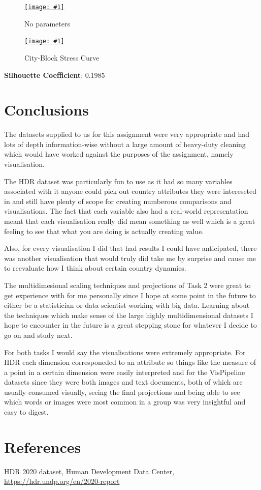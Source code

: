 \documentclass[11pt,a4paper,final]{article}
\newcommand\onlinefig[3]{
\begin{figure}[H]
  \centering
  \href{#3}{\texttt{[image: \#1]}}
  \caption{#2} 
  \label{fig:#1}
\end{figure}
}
\begin{document}
\begin{multicols}{2}
\onlinefig{hdr/pca/pca_hdr_projection_1}{No parameters}{https://user-images.githubusercontent.com/56483187/155839911-ca81d27b-6f95-4806-85ca-5b7c857d63eb.png}
\columnbreak
\onlinefig{hdr/pca/stress_curve_pca_hdr_projection_1}{City-Block Stress Curve}{https://user-images.githubusercontent.com/56483187/155839912-f0c03d4c-7a6b-4d5d-b96d-120ae89074a7.png}
\textbf{Silhouette Coefficient}: 0.1985

\vfill\null
\end{multicols}


\section{Conclusions}
The datasets supplied to us for this assignment were very appropriate and had lots of depth information-wise without a large amount of heavy-duty cleaning which would have worked against the purposes of the assignment, namely visualisation.

The HDR dataset was particularly fun to use as it had so many variables associated with it anyone could pick out country attributes they were intereseted in and still have plenty of scope for creating numberous comparisons and visualisations. The fact that each variable also had a real-world representation meant that each visualisation really did mean something as well which is a great feeling to see that what you are doing is actually creating value.

Also, for every visualisation I did that had results I could have anticipated, there was another visualisation that would truly did take me by surprise and cause me to reevaluate how I think about certain country dynamics.

The multidimesional scaling techniques and projections of Task 2 were great to get experience with for me personally since I hope at some point in the future to either be a statistician or data scientist working with big data. Learning about the techniques which make sense of the large highly multidimensional datasets I hope to encounter in the future is a great stepping stone for whatever I decide to go on and study next.

For both tasks I would say the visualisations were extremely appropriate. For HDR each dimension corresponeded to an attribute so things like the measure of a point in a certain dimension were easily interpreted and for the VisPipeline datasets since they were both images and text documents, both of which are usually consumed visually, seeing the final projections and being able to see which words or images were most common in a group was very insightful and easy to digest.

\section{References}
\label{sec:References}
HDR 2020 dataset, Human Development Data Center, \href{https://hdr.undp.org/en/2020-report}{https://hdr.undp.org/en/2020-report}
\end{document}
